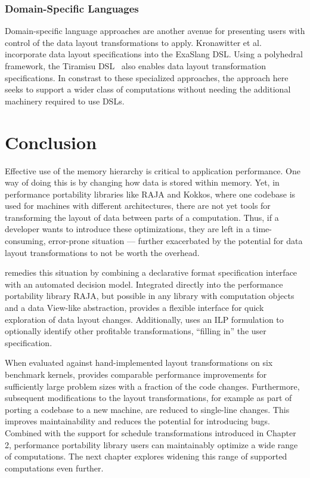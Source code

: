 \subsubsection{Domain-Specific Languages}
Domain-specific language approaches are another avenue for presenting users with control of the data layout transformations to apply. 
Kronawitter et al.~\cite{kronawitter2018automatic} incorporate data layout specifications into the ExaSlang DSL.
Using a polyhedral framework, the Tiramisu DSL~\cite{baghdadi2019tiramisu} also enables data layout transformation specifications.
In constrast to these specialized approaches, the approach here seeks to support a wider class of computations without needing the additional machinery required to use DSLs. 


\section{Conclusion}

Effective use of the memory hierarchy is critical to application performance.
One way of doing this is by changing how data is stored within memory.
Yet, in performance portability libraries like RAJA and Kokkos, where one codebase is used for machines with different architectures, there are not yet tools for transforming the layout of data between parts of a computation. 
Thus, if a developer wants to introduce these optimizations, they are left in a time-consuming, error-prone situation --- further exacerbated by the potential for data layout transformations to not be worth the overhead.

\FormatDecisions{} remedies this situation by combining a declarative format specification interface with an automated decision model.
Integrated directly into the performance portability library RAJA, but possible in any library with computation objects and a data View-like abstraction, \FormatDecisions{} provides a flexible interface for quick exploration of data layout changes. 
Additionally, \FormatDecisions{} uses an ILP formulation to optionally identify other profitable transformations, \enquote{filling in} the user specification.

When evaluated against hand-implemented layout transformations on six benchmark kernels, \FormatDecisions{} provides comparable performance improvements for sufficiently large problem sizes with a fraction of the code changes.
Furthermore, subsequent modifications to the layout transformations, for example as part of porting a codebase to a new machine, are reduced to single-line changes. 
This improves maintainability and reduces the potential for introducing bugs.
Combined with the support for schedule transformations introduced in Chapter 2, performance portability library users can maintainably optimize a wide range of computations. 
The next chapter explores widening this range of supported computations even further.
